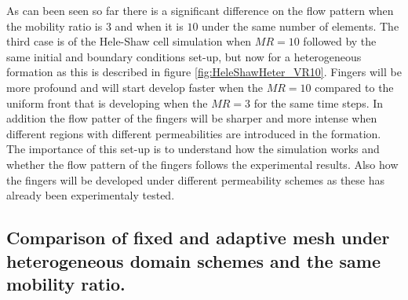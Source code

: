 \documentclass[preprint,authoryear,12pt]{elsarticle}
\begin{document}
\medskip
As can been seen so far there is %
a significant difference on the flow pattern when the mobility ratio is $3$ and when it is $10$ under the same number of elements. %
The third case is of the Hele-Shaw cell simulation when $MR=10$ followed by the same initial and boundary conditions set-up, but now for a heterogeneous formation as this is described in figure \ref{fig:HeleShawHeter_VR10}. %
 Fingers will be more profound and will start develop faster when the $MR=10$ compared to the uniform front that is developing when the $MR=3$ for the same time steps. In addition the flow patter of the fingers will be sharper and more intense when different regions with different permeabilities are introduced in the formation. The importance of this set-up is to understand how the simulation works and whether the flow pattern of the fingers follows the experimental results. Also how the fingers will be developed under different permeability schemes as these has already been experimentaly tested.  


\subsection{Comparison of fixed and adaptive mesh under heterogeneous domain schemes and the same mobility ratio.}\label{section:results_hete_fix_adapt}
\end{document}
